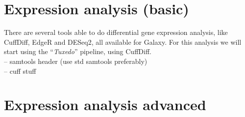 \documentclass[11pt,a4paper]{article}
\begin{document}


\section{Expression analysis (basic)}
There are several tools able to do differential gene expression analysis, like CuffDiff, EdgeR and DESeq2, all available for Galaxy.
For this analysis we will start using the ``\textit{Tuxedo}'' pipeline, using CuffDiff.
\\
-- samtools header (use std samtools preferably)\\
-- cuff stuff


\section{Expression analysis advanced}
\end{document}
